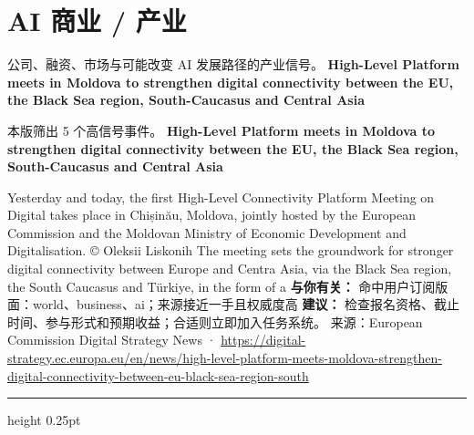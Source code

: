 \documentclass[10.5pt]{ctexart}
\begin{document}
\section*{AI 商业 / 产业}
{\color{ormuted} 公司、融资、市场与可能改变 AI 发展路径的产业信号。}
\vspace{2mm}
{\LARGE\bfseries High-Level Platform meets in Moldova to strengthen digital connectivity between the EU, the Black Sea region, South-Caucasus and Central Asia}\par
\vspace{1mm}
{\color{ormuted} 本版筛出 5 个高信号事件。}
\vspace{3mm}
{\Large\bfseries High-Level Platform meets in Moldova to strengthen digital connectivity between the EU, the Black Sea region, South-Caucasus and Central Asia}\par
Yesterday and today, the first High-Level Connectivity Platform Meeting on Digital takes place in Chișinău, Moldova, jointly hosted by the European Commission and the Moldovan Ministry of Economic Development and Digitalisation. © Oleksii Liskonih The meeting sets the groundwork for stronger digital connectivity between Europe and Centra Asia, via the Black Sea region, the South Caucasus and Türkiye, in the form of a
\textbf{与你有关：} 命中用户订阅版面：world、business、ai；来源接近一手且权威度高
\textbf{建议：} 检查报名资格、截止时间、参与形式和预期收益；合适则立即加入任务系统。
{\footnotesize\color{ormuted} 来源：European Commission Digital Strategy News · \url{https://digital-strategy.ec.europa.eu/en/news/high-level-platform-meets-moldova-strengthen-digital-connectivity-between-eu-black-sea-region-south}}
\vspace{4mm}
\hrule height 0.25pt
\vspace{3mm}
\end{document}
